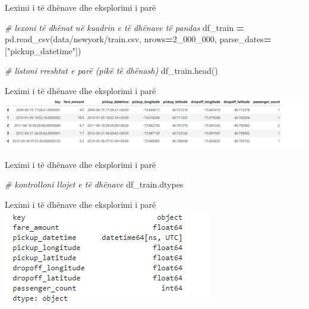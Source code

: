 \documentclass[
  ignorenonframetext,
]{beamer}
\newenvironment{Shaded}{\begin{snugshade}}{\end{snugshade}}
\newcommand{\CommentTok}[1]{\textcolor[rgb]{0.56,0.35,0.01}{\textit{#1}}}
\newcommand{\DecValTok}[1]{\textcolor[rgb]{0.00,0.00,0.81}{#1}}
\newcommand{\NormalTok}[1]{#1}
\newcommand{\OperatorTok}[1]{\textcolor[rgb]{0.81,0.36,0.00}{\textbf{#1}}}
\newcommand{\StringTok}[1]{\textcolor[rgb]{0.31,0.60,0.02}{#1}}
\begin{document}
\begin{frame}[fragile]{Leximi i të dhënave dhe eksplorimi i parë}
\protect\hypertarget{leximi-i-tuxeb-dhuxebnave-dhe-eksplorimi-i-paruxeb-2}{}

\begin{Shaded}
\begin{Highlighting}[]
\CommentTok{\# lexoni të dhënat në kuadrin e të dhënave të pandas}
\NormalTok{df\_train }\OperatorTok{=}\NormalTok{ pd.read\_csv(}\StringTok{\textquotesingle{}data/newyork/train.csv\textquotesingle{}}\NormalTok{, nrows}\OperatorTok{=}\DecValTok{2\_000\_000}\NormalTok{, parse\_dates}\OperatorTok{=}\NormalTok{[}\StringTok{"pickup\_datetime"}\NormalTok{])}

\CommentTok{\# listoni rreshtat e parë (pikë të dhënash)}
\NormalTok{df\_train.head()}
\end{Highlighting}
\end{Shaded}
\end{frame}

\begin{frame}{Leximi i të dhënave dhe eksplorimi i parë}
\protect\hypertarget{leximi-i-tuxeb-dhuxebnave-dhe-eksplorimi-i-paruxeb-3}{}
\includegraphics{./Figs/train.png}
\end{frame}

\begin{frame}[fragile]{Leximi i të dhënave dhe eksplorimi i parë}
\protect\hypertarget{leximi-i-tuxeb-dhuxebnave-dhe-eksplorimi-i-paruxeb-4}{}

\begin{Shaded}
\begin{Highlighting}[]
\CommentTok{\# kontrolloni llojet e të dhënave}
\NormalTok{df\_train.dtypes}
\end{Highlighting}
\end{Shaded}
\end{frame}

\begin{frame}{Leximi i të dhënave dhe eksplorimi i parë}
\protect\hypertarget{leximi-i-tuxeb-dhuxebnave-dhe-eksplorimi-i-paruxeb-5}{}
\includegraphics{./Figs/train1.png}
\end{frame}
\end{document}
